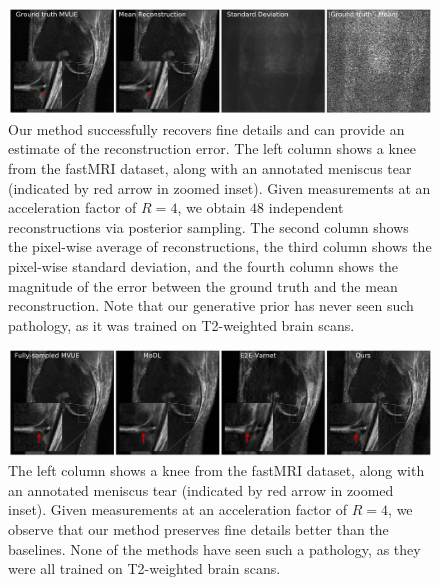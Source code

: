 \begin{figure}
    \centering
    \includegraphics[width=\columnwidth]{uncertainty_case_1_annotated-comp.pdf}
    \caption{\small Our method successfully recovers fine details and can provide an estimate of the reconstruction error. The left column shows a knee from the fastMRI dataset, along with an annotated meniscus tear (indicated by red arrow in zoomed inset). Given measurements at an acceleration factor of $R=4$, we obtain $48$ independent reconstructions via posterior sampling. The second column shows the pixel-wise average of reconstructions, the third column shows the pixel-wise standard deviation, and the fourth column shows the magnitude of the error between the ground truth and the mean reconstruction. Note that our generative prior has never seen such pathology, as it was trained on T2-weighted brain scans.}
    \label{fig:uncertainty-app}
\end{figure}

\begin{figure}[t]
\begin{center}
  \includegraphics[width=\columnwidth]{meniscus_tear_case_1_annotated-comp.pdf}
\end{center}
\caption{\small The left column shows a knee from the fastMRI dataset, along with an annotated meniscus tear (indicated by red arrow in zoomed inset). Given measurements at an acceleration factor of $R=4$, we observe that our method preserves fine details better than the baselines. None of the methods have seen such a pathology, as they were all trained on T2-weighted brain scans.}
\label{fig:tear-baslines-1}
\end{figure}

